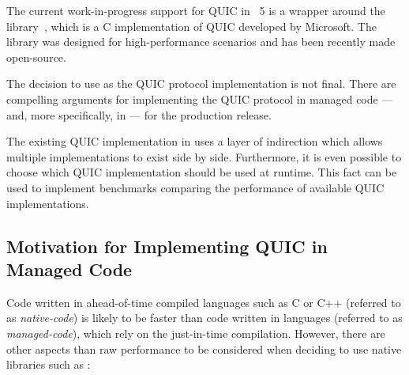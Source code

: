 The current work-in-progress support for QUIC in \dotnet{}~5 is a wrapper around the \libmsquic{}
library~\cite{msquicGithub}, which is a C implementation of QUIC developed by Microsoft. The
\libmsquic{} library was designed for high-performance scenarios and has been recently made
open-source.

The decision to use \libmsquic{} as the QUIC protocol implementation is not final. There are
compelling arguments for implementing the QUIC protocol in managed \dotnet{} code --- and, more
specifically, in \csharp{} --- for the production release.

The existing QUIC implementation in \dotnet{} uses a layer of indirection which allows multiple
implementations to exist side by side. Furthermore, it is even possible to choose which QUIC
implementation should be used at runtime. This fact can be used to implement benchmarks comparing
the performance of available QUIC implementations.

\subsection*{Motivation for Implementing QUIC in Managed Code}

Code written in ahead-of-time compiled languages such as C or C++ (referred to as
\textit{\gls{native-code}}) is likely to be faster than code written in \dotnet{} languages
(referred to as \textit{\gls{managed-code}}), which rely on the just-in-time compilation. However,
there are other aspects than raw performance to be considered when deciding to use native libraries
such as \libmsquic{}:

